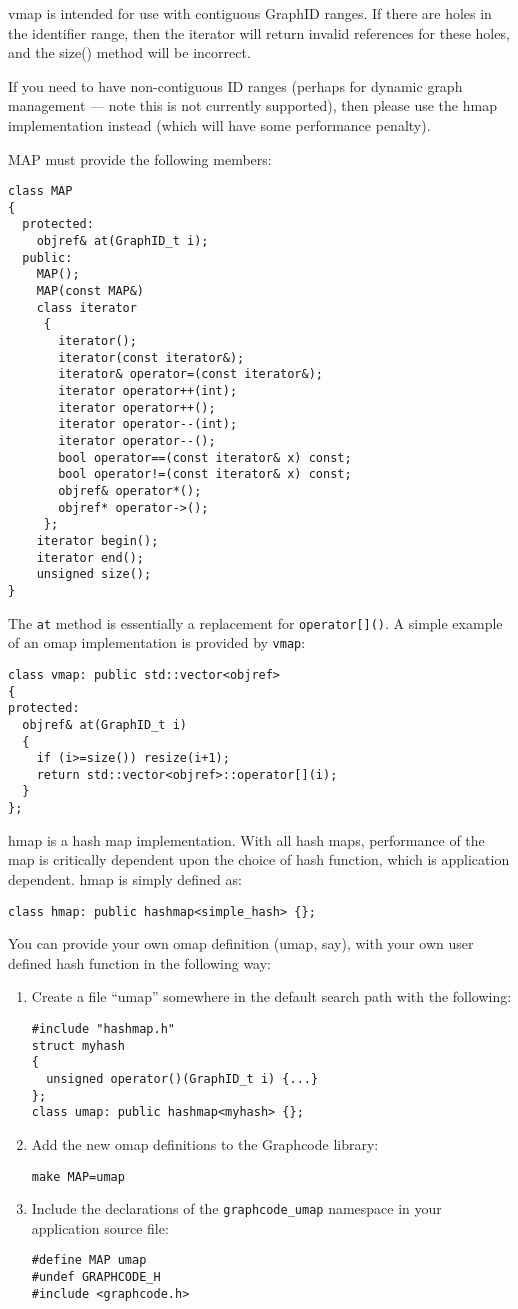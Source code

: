 vmap is intended for use with contiguous GraphID ranges. If there are
holes in the identifier range, then the iterator will return invalid
references for these holes, and the size() method will be incorrect.

If you need to have non-contiguous ID ranges (perhaps for dynamic
graph management --- note this is not currently supported), then please
use the hmap implementation instead (which will have some performance
penalty).


MAP must provide the following members:
\begin{verbatim}
class MAP
{
  protected:
    objref& at(GraphID_t i);
  public:
    MAP();
    MAP(const MAP&)
    class iterator
     {
       iterator();
       iterator(const iterator&);
       iterator& operator=(const iterator&); 
       iterator operator++(int);
       iterator operator++();
       iterator operator--(int);
       iterator operator--();
       bool operator==(const iterator& x) const;
       bool operator!=(const iterator& x) const;
       objref& operator*();
       objref* operator->();
     };
    iterator begin();
    iterator end();
    unsigned size();
}
\end{verbatim}
   
The \verb+at+ method is essentially a replacement for \verb+operator[]()+. A
simple example of an omap implementation is provided by \verb+vmap+:
\begin{verbatim}
class vmap: public std::vector<objref>
{
protected:
  objref& at(GraphID_t i) 
  {
    if (i>=size()) resize(i+1);
    return std::vector<objref>::operator[](i);
  }
};
\end{verbatim}

hmap is a hash map implementation. With all hash maps, performance of
the map is critically dependent upon the choice of hash function, which
is application dependent. hmap is simply defined as:
\begin{verbatim}
class hmap: public hashmap<simple_hash> {};
\end{verbatim}
You can provide your own omap definition (umap, say), with your own
user defined hash function in the following way:
\begin{enumerate}
\item Create a file ``umap'' somewhere in the default search path with
  the following:
\begin{verbatim}
#include "hashmap.h"
struct myhash
{
  unsigned operator()(GraphID_t i) {...}
};
class umap: public hashmap<myhash> {};
\end{verbatim}
\item Add the new omap definitions to the Graphcode library:
\begin{verbatim}
make MAP=umap
\end{verbatim}
\item Include the declarations of the \verb+graphcode_umap+ namespace
  in your application source file:
\begin{verbatim}
#define MAP umap
#undef GRAPHCODE_H
#include <graphcode.h>
\end{verbatim}
\end{enumerate}

